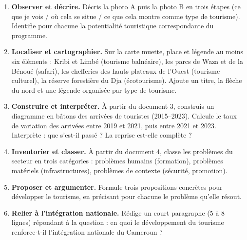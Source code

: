 \documentclass[11pt]{article}
\newcommand{\cle}[1]{{\popxbold\color{popdark}#1}}
\newcounter{popsec}
\newcounter{popsub}
\newcommand{\courssub}[1]{%
  \stepcounter{popsub}%
  \par\vspace{9pt}\noindent{\popxbold\fontsize{11.5}{13}\selectfont\color{popink}{\color{poporange}\thepopsec.\thepopsub}\hspace{6pt}#1}\par\nopagebreak\vspace{4pt}
}
\begin{document}
\begin{enumerate}
\item \textbf{Observer et décrire.} Décris la photo A puis la photo B en trois étapes (ce que je vois / où cela se situe / ce que cela montre comme type de tourisme). Identifie pour chacune la \cle{potentialité} touristique correspondante du programme.
\item \textbf{Localiser et cartographier.} Sur la carte muette, place et légende au moins six éléments : Kribi et Limbé (tourisme balnéaire), les parcs de Waza et de la Bénoué (safari), les chefferies des hauts plateaux de l'Ouest (tourisme culturel), la réserve forestière du Dja (écotourisme). Ajoute un titre, la flèche du nord et une légende organisée par type de tourisme.
\item \textbf{Construire et interpréter.} À partir du document 3, construis un diagramme en bâtons des arrivées de touristes (2015--2023). Calcule le taux de variation des arrivées entre 2019 et 2021, puis entre 2021 et 2023. Interprète : que s'est-il passé ? La reprise est-elle complète ?
\item \textbf{Inventorier et classer.} À partir du document 4, classe les problèmes du secteur en trois catégories : problèmes humains (formation), problèmes matériels (infrastructures), problèmes de contexte (sécurité, promotion).
\item \textbf{Proposer et argumenter.} Formule trois propositions concrètes pour développer le tourisme, en précisant pour chacune le problème qu'elle résout.
\item \textbf{Relier à l'intégration nationale.} Rédige un court paragraphe (5 à 8 lignes) répondant à la question : en quoi le développement du tourisme renforce-t-il l'intégration nationale du Cameroun ?
\end{enumerate}

\courssub{Ressources à mobiliser}
\end{document}
